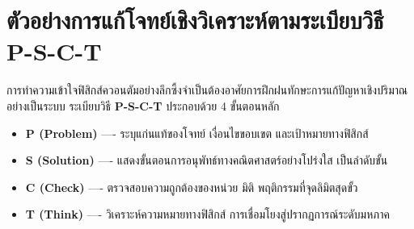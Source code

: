 \section{ตัวอย่างการแก้โจทย์เชิงวิเคราะห์ตามระเบียบวิธี P-S-C-T}

การทำความเข้าใจฟิสิกส์ควอนตัมอย่างลึกซึ้งจำเป็นต้องอาศัยการฝึกฝนทักษะการแก้ปัญหาเชิงปริมาณอย่างเป็นระบบ ระเบียบวิธี \textbf{P-S-C-T} ประกอบด้วย 4 ขั้นตอนหลัก
\begin{itemize}
    \item \textbf{P (Problem)} ---- ระบุแก่นแท้ของโจทย์ เงื่อนไขขอบเขต และเป้าหมายทางฟิสิกส์
    \item \textbf{S (Solution)} ---- แสดงขั้นตอนการอนุพัทธ์ทางคณิตศาสตร์อย่างโปร่งใส เป็นลำดับขั้น
    \item \textbf{C (Check)} ---- ตรวจสอบความถูกต้องของหน่วย มิติ พฤติกรรมที่จุดลิมิตสุดขั้ว
    \item \textbf{T (Think)} ---- วิเคราะห์ความหมายทางฟิสิกส์ การเชื่อมโยงสู่ปรากฏการณ์ระดับมหภาค
\end{itemize}

